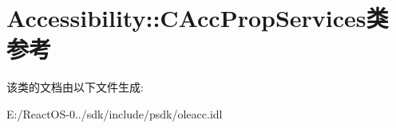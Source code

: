 \hypertarget{class_accessibility_1_1_c_acc_prop_services}{}\section{Accessibility\+:\+:C\+Acc\+Prop\+Services类 参考}
\label{class_accessibility_1_1_c_acc_prop_services}


该类的文档由以下文件生成\+:\begin{DoxyCompactItemize}
\item 
E\+:/\+React\+O\+S-\/0../sdk/include/psdk/oleacc.\+idl\end{DoxyCompactItemize}
